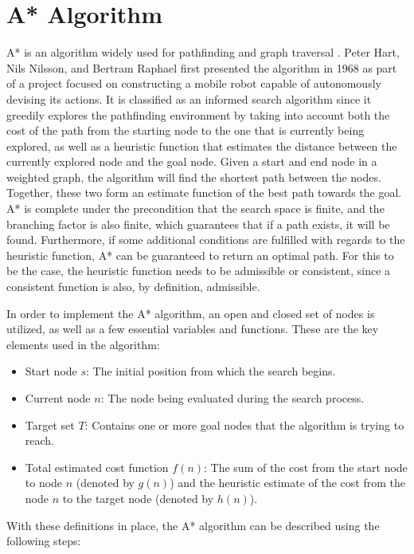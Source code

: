 \section{A* Algorithm}
    A* is an algorithm widely used for pathfinding and graph traversal \cite{A-Star-Algorithm}. Peter Hart, Nils Nilsson, and Bertram Raphael first presented the algorithm in 1968 as part of a project focused on constructing a mobile robot capable of autonomously devising its actions. It is classified as an informed search algorithm since it greedily explores the pathfinding environment by taking into account both the cost of the path from the starting node to the one that is currently being explored, as well as a heuristic function that estimates the distance between the currently explored node and the goal node. Given a start and end node in a weighted graph, the algorithm will find the shortest path between the nodes. Together, these two form an estimate function of the best path towards the goal. A* is complete under the precondition that the search space is finite, and the branching factor is also finite, which guarantees that if a path exists, it will be found. Furthermore, if some additional conditions are fulfilled with regards to the heuristic function, A* can be guaranteed to return an optimal path. For this to be the case, the heuristic function needs to be admissible or consistent, since a consistent function is also, by definition, admissible.
    
    In order to implement the A* algorithm, an open and closed set of nodes is utilized, as well as a few essential variables and functions. These are the key elements used in the algorithm:

    \begin{itemize}
        \item Start node $s$: The initial position from which the search begins.
        \item Current node $n$: The node being evaluated during the search process.
        \item Target set $T$: Contains one or more goal nodes that the algorithm is trying to reach.
        \item Total estimated cost function $f(n)$: The sum of the cost from the start node to node $n$ (denoted by $g(n)$) and the heuristic estimate of the cost from the node $n$ to the target node (denoted by $h(n)$).
    \end{itemize}

    With these definitions in place, the A* algorithm can be described using the following steps:


